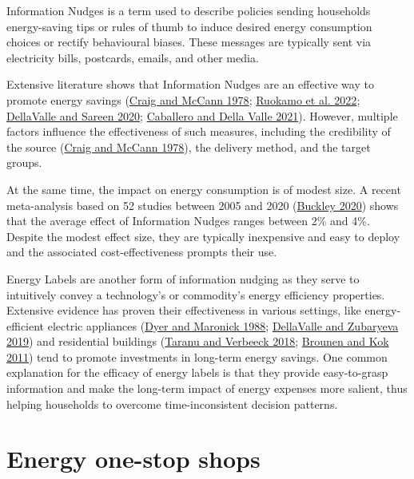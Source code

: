 \documentclass[
  11pt,
  captions=heading]{scrreport}
\begin{document}
Information Nudges is a term used to describe policies sending
households energy-saving tips or rules of thumb to induce desired energy
consumption choices or rectify behavioural biases. These messages are
typically sent via electricity bills, postcards, emails, and other
media.

Extensive literature shows that Information Nudges are an effective way
to promote energy savings
(\protect\hyperlink{ref-craig1978assessing}{Craig and McCann 1978};
\protect\hyperlink{ref-ruokamo2022effect}{Ruokamo et al. 2022};
\protect\hyperlink{ref-dellavalle2020nudging}{DellaValle and Sareen
2020}; \protect\hyperlink{ref-caballero2021tackling}{Caballero and Della
Valle 2021}). However, multiple factors influence the effectiveness of
such measures, including the credibility of the source
(\protect\hyperlink{ref-craig1978assessing}{Craig and McCann 1978}), the
delivery method, and the target groups.

At the same time, the impact on energy consumption is of modest size. A
recent meta-analysis based on 52 studies between 2005 and 2020
(\protect\hyperlink{ref-buckley2020prices}{Buckley 2020}) shows that the
average effect of Information Nudges ranges between 2\% and 4\%. Despite
the modest effect size, they are typically inexpensive and easy to
deploy and the associated cost-effectiveness prompts their use.

Energy Labels are another form of information nudging as they serve to
intuitively convey a technology's or commodity's energy efficiency
properties. Extensive evidence has proven their effectiveness in various
settings, like energy-efficient electric appliances
(\protect\hyperlink{ref-dyer1988evaluation}{Dyer and Maronick 1988};
\protect\hyperlink{ref-dellavalle2019can}{DellaValle and Zubaryeva
2019}) and residential buildings
(\protect\hyperlink{ref-taranu2018closer}{Taranu and Verbeeck 2018};
\protect\hyperlink{ref-brounen2011economics}{Brounen and Kok 2011}) tend
to promote investments in long-term energy savings. One common
explanation for the efficacy of energy labels is that they provide
easy-to-grasp information and make the long-term impact of energy
expenses more salient, thus helping households to overcome
time-inconsistent decision patterns.

\hypertarget{energy-one-stop-shops}{%
\section{Energy one-stop shops}\label{energy-one-stop-shops}}
\end{document}
